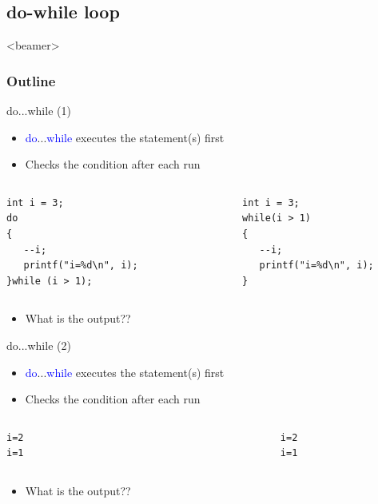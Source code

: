 \subsection{do-while loop}
\begin{frame}<beamer>
    \frametitle{Outline}
\end{frame}

\begin{frame}[fragile]{do...while (1)}
\begin{itemize}
	\item {\textcolor{blue}{do}...\textcolor{blue}{while} executes the statement(s) first}
	\item {Checks the condition after each run}
\end{itemize}	
\begin{columns}
\begin{column}{0.42\linewidth}
\begin{lstlisting}
int i = 3;
do
{   
   --i;
   printf("i=%d\n", i);
}while (i > 1);
\end{lstlisting}
\end{column}
\begin{column}{0.1\linewidth}
\end{column}
\begin{column}{0.42\linewidth}
\begin{lstlisting}
int i = 3;
while(i > 1)
{
   --i;
   printf("i=%d\n", i);
}
\end{lstlisting}
\end{column}
\end{columns}
\begin{itemize}
	\item {What is the output??}
\end{itemize}
\end{frame}

\begin{frame}[fragile]{do...while (2)}
\begin{itemize}
	\item {\textcolor{blue}{do}...\textcolor{blue}{while} executes the statement(s) first}
	\item {Checks the condition after each run}
\end{itemize}	
\begin{columns}
\begin{column}{0.4\linewidth}
\begin{lstlisting}
i=2
i=1
\end{lstlisting}
\end{column}
\begin{column}{0.1\linewidth}
\end{column}
\begin{column}{0.4\linewidth}
\begin{lstlisting}
i=2
i=1
\end{lstlisting}
\end{column}
\end{columns}
\begin{itemize}
	\item {What is the output??}
\end{itemize}
\end{frame}

